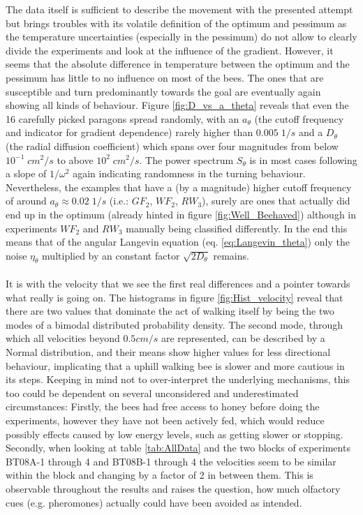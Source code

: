 The data itself is sufficient to describe the movement with the presented attempt but brings troubles with its volatile definition of the optimum and pessimum as the temperature uncertainties (especially in the pessimum) do not allow to clearly divide the experiments and look at the influence of the gradient. However, it seems that the absolute difference in temperature between the optimum and the pessimum has little to no influence on most of the bees. The ones that are susceptible and turn predominantly towards the goal are eventually again showing all kinds of behaviour. Figure \ref{fig:D_vs_a_theta} reveals that even the 16 carefully picked paragons spread randomly, with an $a_{\theta}$ (the cutoff frequency and indicator for gradient dependence) rarely higher than $0.005 \; 1/s$ and a $D_{\theta}$ (the radial diffusion coefficient) which spans over four magnitudes from below $10^{-1} \; cm^{2}/s$ to above $10^{2} \; cm^{2}/s$. The power spectrum $S_{\theta}$ is in most cases following a slope of $1/\omega^{2}$ again indicating randomness in the turning behaviour. Nevertheless, the examples that have a (by a magnitude) higher cutoff frequency of around $a_{\theta} \approx 0.02 \; 1/s$ (i.e.: $GF_{2}$, $WF_{2}$, $RW_{3}$), surely are ones that actually did end up in the optimum (already hinted in figure \ref{fig:Well_Beehaved}) although in experiments $WF_{2}$ and $RW_{3}$ manually being classified differently. In the end this means that of the angular Langevin equation (eq. \ref{eq:Langevin_theta}) only the noise $\eta_{\theta}$ multiplied by an constant factor $\sqrt{2D_{\theta}}$ remains. 
\\
\\
It is with the velocity that we see the first real differences and a pointer towards what really is going on. The histograms in figure \ref{fig:Hist_velocity} reveal that there are two values that dominate the act of walking itself by being the two modes of a bimodal distributed probability density. The second mode, through which all velocities beyond $0.5 cm/s$ are represented, can be described by a Normal distribution, and their means show higher values for less directional behaviour, implicating that a uphill walking bee is slower and more cautious in its steps.
Keeping in mind not to over-interpret the underlying mechanisms, this too could be dependent on several unconsidered and underestimated circumstances: Firstly, the bees had free access to honey before doing the experiments, however they have not been actively fed, which would reduce possibly effects caused by low energy levels, such as getting slower or stopping. Secondly, when looking at table \ref{tab:AllData} and the two blocks of experiments BT08A-1 through 4 and BT08B-1 through 4 the velocities seem to be similar within the block and changing by a factor of 2 in between them. This is observable throughout the results and raises the question, how much olfactory cues (e.g. pheromones) actually could have been avoided as intended.
